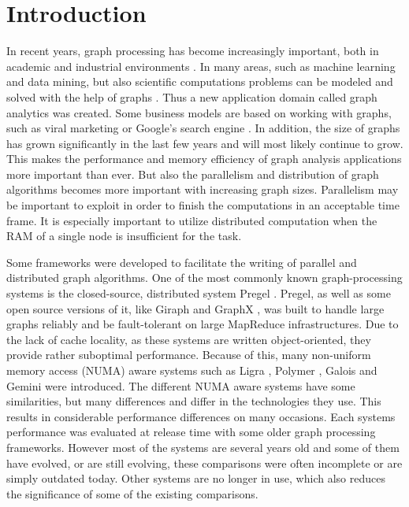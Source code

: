 \section{Introduction}
In recent years, graph processing has become increasingly important, both in academic and industrial environments \cite{Gemini}.
In many areas, such as machine learning and data mining, but also scientific computations problems can be modeled and solved with the help of graphs \cite{Polymer}.
Thus a new application domain called graph analytics was created.
Some business models are based on working with graphs, such as viral marketing \cite{viralMarketing} or Google's search engine \cite{pagerank}.
In addition, the size of graphs has grown significantly in the last few years and will most likely continue to grow.
This makes the performance and memory efficiency of graph analysis applications more important than ever.
But also the parallelism and distribution of graph algorithms becomes more important with increasing graph sizes.
Parallelism may be important to exploit in order to finish the computations in an acceptable time frame.
It is especially important to utilize distributed computation when the RAM of a single node is insufficient for the task.

Some frameworks were developed to facilitate the writing of parallel and distributed graph algorithms.
One of the most commonly known graph-processing systems is the closed-source, distributed system Pregel \cite{pregel}.
Pregel, as well as some open source versions of it, like Giraph \cite{Giraph} and GraphX \cite{graphx}, was built to handle large graphs reliably and be fault-tolerant on large MapReduce infrastructures.
Due to the lack of cache locality, as these systems are written object-oriented, they provide rather suboptimal performance.
Because of this, many non-uniform memory access (NUMA) aware systems such as Ligra \cite{Ligra}, Polymer \cite{Polymer}, Galois \cite{Galois} and Gemini \cite{Gemini} were introduced.
The different NUMA aware systems have some similarities, but many differences and differ in the technologies they use.
This results in considerable performance differences on many occasions.
Each systems performance was evaluated at release time with some older graph processing frameworks.
However most of the systems are several years old and some of them have evolved, or are still evolving, these comparisons were often incomplete or are simply outdated today.
Other systems are no longer in use, which also reduces the significance of some of the existing comparisons.

